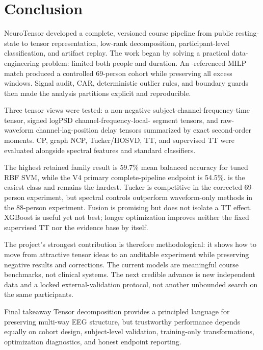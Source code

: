 \chapter{Conclusion}
\label{ch:conclusion}

NeuroTensor developed a complete, versioned course pipeline from public
resting-state \EEG{} to tensor representation, low-rank decomposition,
participant-level classification, and artifact replay. The work began by solving
a practical data-engineering problem: \FTD{} limited both people and duration.
An \FTD{}-referenced MILP match produced a controlled 69-person cohort while
preserving all excess windows. Signal audit, CAR, deterministic outlier rules,
and boundary guards then made the analysis partitions explicit and reproducible.

Three tensor views were tested: a non-negative
subject-channel-frequency-time tensor, signed logPSD channel-frequency-local-
segment tensors, and raw-waveform channel-lag-position delay tensors summarized
by exact second-order moments. CP, graph NCP, Tucker/HOSVD, TT, and supervised TT
were evaluated alongside spectral features and standard classifiers.

The highest retained family result is 59.7\% mean balanced accuracy for tuned
RBF SVM, while the V4 primary complete-pipeline endpoint is 54.5\%. \CN{} is the
easiest class and \FTD{} remains the hardest. Tucker is competitive in the
corrected 69-person experiment, but spectral controls outperform waveform-only
methods in the 88-person experiment. Fusion is promising but does not isolate a
TT effect. XGBoost is useful yet not best; longer optimization improves neither
the fixed supervised TT nor the evidence base by itself.

The project's strongest contribution is therefore methodological: it shows how
to move from attractive tensor ideas to an auditable experiment while preserving
negative results and corrections. The current models are meaningful course
benchmarks, not clinical systems. The next credible advance is new independent
\FTD{} data and a locked external-validation protocol, not another unbounded
search on the same participants.

\begin{keybox}{Final takeaway}
Tensor decomposition provides a principled language for preserving multi-way
EEG structure, but trustworthy performance depends equally on cohort design,
subject-level validation, training-only transformations, optimization diagnostics,
and honest endpoint reporting.
\end{keybox}

